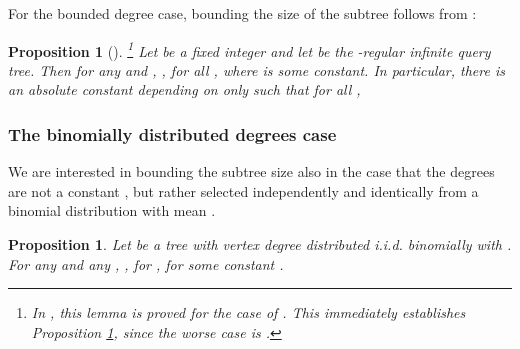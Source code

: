 \documentclass[english, oribibl]{llncs}
\newtheorem{proposition}[theorem]{Proposition}
\begin{document}
For the bounded degree case, bounding the size of the subtree follows from \cite{ARV+11}:





\begin{proposition} [\cite{ARV+11}] \footnote{In \cite{ARV+11}, this lemma is proved for the case of . This immediately establishes Proposition \ref{lemma:bounded}, since the worse case is .}
\label{lemma:bounded}
Let  be a fixed integer
and let  be the -regular infinite query tree.
Then for any  and ,
,
for all , where  is some constant.
In particular, there is an absolute constant  depending on  only such that
for all ,

\end{proposition}



\subsubsection{The binomially distributed degrees case}
\label{subtree_app}

We are interested in bounding the subtree size also in the case that the degrees are not a constant , but rather selected independently and identically from a binomial distribution with mean .
\begin{proposition}
\label{lemma:binomial}
 Let  be a tree with vertex degree distributed i.i.d. binomially with . For any  and any ,
,
 for , for some constant .
\end{proposition}
\end{document}
